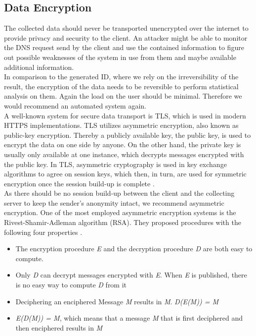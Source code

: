     \subsection{Data Encryption}
        \label{subsec:software_design:encryption}
        The collected data should never be transported unencrypted over the internet to provide privacy and security to the client. An attacker might be able to monitor the DNS request send by the client and use the contained information to figure out possible weaknesses of the system in use from them and maybe available additional information. \\
        In comparison to the generated ID, where we rely on the irreversibility of the result, the encryption of the data needs to be reversible to perform statistical analysis on them.
        Again the load on the user should be minimal. Therefore we would recommend an automated system again.\\
        A well-known system for secure data transport is TLS, which is used in modern HTTPS implementations. TLS utilizes asymmetric encryption, also known as public-key encryption. 
        Thereby a publicly available key, the public key, is used to encrypt the data on one side by anyone. On the other hand, the private key is usually only available at one instance, which decrypts messages encrypted with the public key. In TLS, asymmetric cryptography is used in key exchange algorithms to agree on session keys, which then, in turn, are used for symmetric encryption once the session build-up is complete \cite{noauthor_how_nodate}.\\
        As there should be no session build-up between the client and the collecting server to keep the sender's anonymity intact, we recommend asymmetric encryption.
        One of the most employed asymmetric encryption systems is the Rivest-Shamir-Adleman algorithm (RSA). They proposed procedures with the following four properties \cite{rivest_method_1978}.
        \begin{itemize}
            \item The encryption procedure \textit{E} and the decryption procedure \textit{D} are both easy to compute.
            \item Only \textit{D} can decrypt messages encrypted with \textit{E}. When \textit{E} is published, there is no easy way to compute \textit{D} from it
            \item Deciphering an enciphered Message \textit{M} results in \textit{M}. \textit{D(E(M)) = M}
            \item \textit{E(D(M)) = M}, which means that a message \textit{M} that is first deciphered and then enciphered results in \textit{M}
        \end{itemize}
